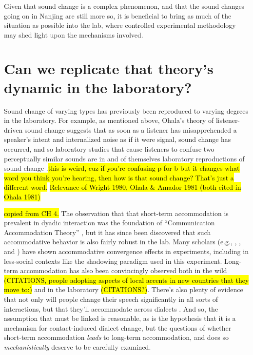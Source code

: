     Given that sound change is a complex phenomenon, and that the sound changes going on in Nanjing are still more so, it is beneficial to bring as much of the situation as possible into the lab, where controlled experimental methodology may shed light upon the mechanisms involved. 

\section{Can we replicate that theory's dynamic in the laboratory?}
    Sound change of varying types has previously been reproduced to varying degrees in the laboratory. For example, as mentioned above, Ohala's theory of listener-driven sound change suggests that as soon as a listener has misapprehended a speaker's intent and internalized noise as if it were signal, sound change has occurred, and so laboratory studies that cause listeners to confuse two perceptually similar sounds are in and of themselves laboratory reproductions of sound change \citep{ohala1989sound}.\hl{this is weird, cuz if you're confusing p for b but it changes what word you think you're hearing, then how is that sound change? That's just a different word.} \hl{Relevance of Wright 1980, Ohala \& Amador 1981 (both cited in Ohala 1981)}
    
    \hl{copied from CH 4.} The observation that that short-term accommodation is prevalent in dyadic interaction \IRL{} was the foundation of ``Communication Accommodation Theory'' \citep{giles1973accent, giles1980accommodation, giles1987speech, giles1991contexts}, but it has since been discovered that such accommodative behavior is also fairly robust in the lab. Many scholars (e.g., \cite{pardo2006phonetic}, \cite{delvaux2007influence} \cite{nielsen2008word}, and \cite{zellou2016phonetic}) have shown accommodative convergence effects in experiments, including in less-social contexts like the shadowing paradigm used in this experiment. Long-term accommodation has also been convincingly observed both in the wild \hl{(CITATIONS, people adopting aspects of local accents in new countries that they move to:)}\citep{chambers1992dialect, kerswill2000creating} and in the laboratory \hl{(CITATIONS?)}. There's also plenty of evidence that not only will people change their speech significantly in all sorts of interactions, but that they'll accommodate across dialects \citep{delvaux2007influence,babel2010dialect,clopper2014sound}. And so, the assumption that \sla{} must be linked is reasonable, as is the hypothesis that it is a mechanism for contact-induced dialect change, but the questions of whether short-term accommodation \emph{leads} to long-term accommodation, and does so \emph{mechanistically} deserve to be carefully examined. 
    
